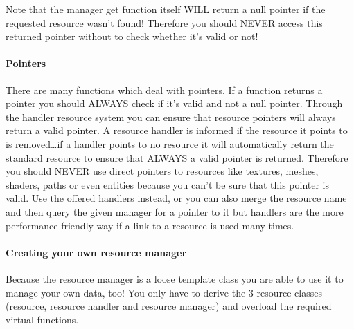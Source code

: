 Note that the manager get function itself WILL return a null pointer if the requested resource wasn't found! Therefore you should NEVER access this returned pointer without to check whether it's valid or not!


\paragraph{Pointers}
There are many functions which deal with pointers. If a function returns a pointer you should ALWAYS check if it's valid and not a null pointer. Through the handler resource system you can ensure that resource pointers will always return a valid pointer. A resource handler is informed if the resource it points to is removed\ldots if a handler points to no resource it will automatically return the standard resource to ensure that ALWAYS a valid pointer is returned. Therefore you should NEVER use direct pointers to resources like textures, meshes, shaders, paths or even entities because you can't be sure that this pointer is valid. Use the offered handlers instead, or you can also merge the resource name and then query the given manager for a pointer to it but handlers are the more performance friendly way if a link to a resource is used many times.


\paragraph{Creating your own resource manager}
Because the resource manager is a loose template class you are able to use it to manage your own data, too! You only have to derive the 3 resource classes (resource, resource handler and resource manager) and overload the required virtual functions.
